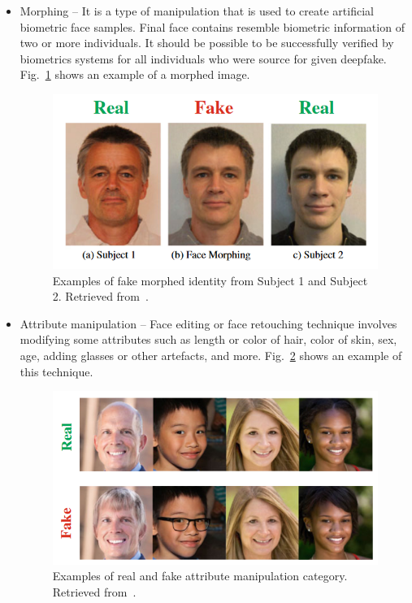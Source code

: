 \begin{itemize}
    \item Morphing – It is a type of manipulation that is used to create artificial biometric face samples. Final face contains resemble biometric information of two or more individuals. It should be possible to be successfully verified by biometrics systems for all individuals who were source for given deepfake. Fig.~\ref{fig:morphing} shows an example of a morphed image.
    \begin{figure}[H]
        \centering
        \includegraphics[width=.45\linewidth]{other-fig/morphing.png}
        \caption{Examples of fake morphed identity from Subject 1 and Subject 2. Retrieved from~\cite{IntroductionToDigitalFaceManipulation}.}
        \label{fig:morphing}
    \end{figure}

    \item Attribute manipulation – Face editing or face retouching technique involves modifying some attributes such as length or color of hair, color of skin, sex, age, adding glasses or other artefacts, and more. Fig.~\ref{fig:attribute_manipulation} shows an example of this technique.
    \begin{figure}[H]
        \centering
        \includegraphics[width=.52\linewidth]{other-fig/attribute_manipulation.png}
        \caption{Examples of real and fake attribute manipulation category. Retrieved from~\cite{IntroductionToDigitalFaceManipulation}.}
        \label{fig:attribute_manipulation}
    \end{figure}


\end{itemize}
